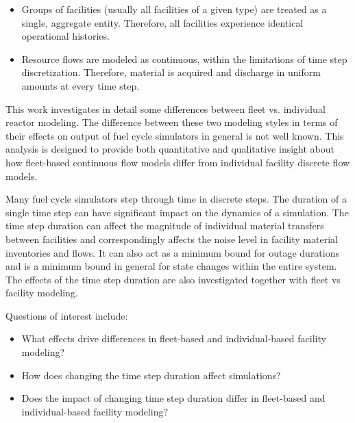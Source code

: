 \documentclass{style}
\begin{document}
\begin{itemize}

    \item Groups of facilities (usually all facilities of a given type) are
        treated as a single, aggregate entity. Therefore, all facilities experience
        identical operational histories.

    \item Resource flows are modeled as continuous, within the limitations of time
        step discretization.  Therefore, material is acquired and discharge in
        uniform amounts at every time step.

\end{itemize}

This work investigates in detail some differences between fleet vs. individual
reactor modeling.  The difference between these two modeling styles in terms
of their effects on output of fuel cycle simulators in general is not well
known. This analysis is designed to provide both quantitative and
qualitative insight about how fleet-based continuous flow models differ from
individual facility discrete flow models.

Many fuel cycle simulators step through time in discrete steps.  The duration
of a single time step can have significant impact on the dynamics of a
simulation.  The time step duration can affect the magnitude of individual
material transfers between facilities and correspondingly affects the noise
level in facility material inventories and flows.  It can also act as a
minimum bound for outage durations and is a minimum bound in general for state
changes within the entire system. The effects of the time step duration are
also investigated together with fleet vs facility modeling.

Questions of interest include:

\begin{itemize}

    \item What effects drive differences in fleet-based and individual-based
        facility modeling?

    \item How does changing the time step duration affect simulations?

    \item Does the impact of changing time step duration differ in fleet-based
        and individual-based facility modeling?

\end{itemize}
\end{document}
